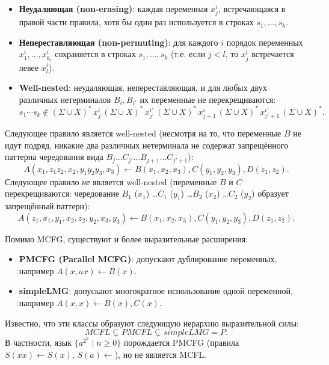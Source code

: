 \begin{itemize}
    \item \textbf{Неудаляющая (non-erasing)}: каждая переменная $x^i_j$, встречающаяся в правой части правила, хотя бы один раз используется в строках $s_1,\ldots,s_k$.
    \item \textbf{Непереставляющая (non-permuting)}: для каждого $i$ порядок переменных $x^i_1,\ldots,x^i_{k_i}$ сохраняется в строках $s_1,\ldots,s_k$ (т.е. если $j < l$, то $x^i_j$ встречается левее $x^i_l$).
    \item \textbf{Well-nested}: неудаляющая, непереставляющая, и для любых двух различных нетерминалов $B_i, B_{i'}$ их переменные не перекрещиваются:
          \[
          s_1\cdots s_k \notin (\Sigma \cup X)^*\, x^i_j\, (\Sigma \cup X)^*\, x^{i'}_{j'}\, (\Sigma \cup X)^*\, x^i_{j+1}\, (\Sigma \cup X)^*\, x^{i'}_{j'+1}\, (\Sigma \cup X)^*.
          \]
\end{itemize}

\begin{example}
    Следующее правило является well-nested (несмотря на то, что переменные $B$ не идут подряд, никакие два различных нетерминала не содержат запрещённого паттерна чередования вида $B_j \ldots C_{j'} \ldots B_{j+1} \ldots C_{j'+1}$):
    \[
    A(x_1, z_1 z_2, x_2, y_1 y_2 y_3, x_3) \leftarrow B(x_1,x_2,x_3), C(y_1,y_2,y_3), D(z_1,z_2).
    \]
    Следующее правило \emph{не} является well-nested (переменные $B$ и $C$ перекрещиваются: чередование $B_1$ ($x_1$) \ldots $C_1$ ($y_1$) \ldots $B_2$ ($x_2$) \ldots $C_2$ ($y_2$) образует запрещённый паттерн):
    \[
    A(z_1, x_1, y_1, x_2, z_2, y_2, x_3, y_3) \leftarrow B(x_1,x_2,x_3), C(y_1,y_2,y_3), D(z_1,z_2).
    \]
\end{example}

Помимо MCFG, существуют и более выразительные расширения:

\begin{itemize}
    \item \textbf{PMCFG (Parallel MCFG)}: допускают дублирование переменных, например $A(x, ax) \leftarrow B(x)$.
    \item \textbf{simpleLMG}: допускают многократное использование одной переменной, например $A(x,x) \leftarrow B(x), C(x)$.
\end{itemize}

Известно, что эти классы образуют следующую иерархию выразительной силы:
\[
MCFL \subsetneq PMCFL \subsetneq simpleLMG = P.
\]
В частности, язык $\{a^{2^n} \mid n \ge 0\}$ порождается PMCFG (правила $S(xx) \leftarrow S(x)$, $S(a) \leftarrow$), но не является MCFL.

